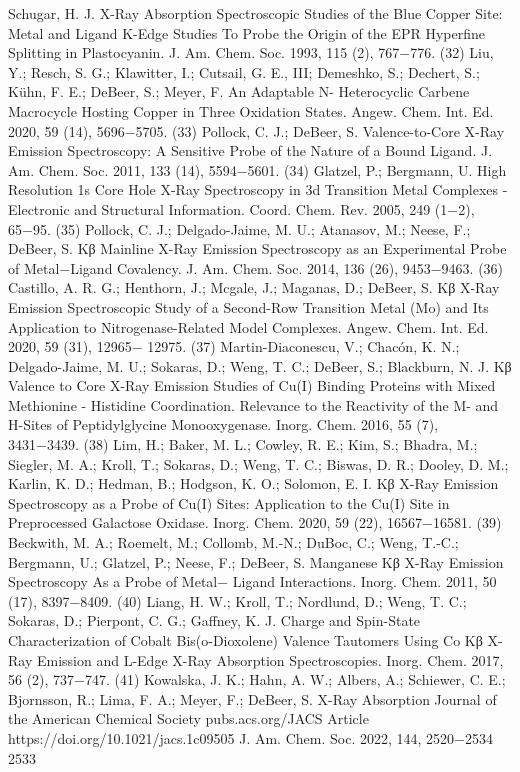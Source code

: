 \documentclass{article}
\begin{document}
Schugar, H. J. X-Ray Absorption Spectroscopic Studies of the Blue
Copper Site: Metal and Ligand K-Edge Studies To Probe the Origin
of the EPR Hyperfine Splitting in Plastocyanin. J. Am. Chem. Soc.
1993, 115 (2), 767−776.
(32) Liu, Y.; Resch, S. G.; Klawitter, I.; Cutsail, G. E., III; Demeshko,
S.; Dechert, S.; Kühn, F. E.; DeBeer, S.; Meyer, F. An Adaptable N-
Heterocyclic Carbene Macrocycle Hosting Copper in Three
Oxidation States. Angew. Chem. Int. Ed. 2020, 59 (14), 5696−5705.
(33) Pollock, C. J.; DeBeer, S. Valence-to-Core X-Ray Emission
Spectroscopy: A Sensitive Probe of the Nature of a Bound Ligand. J.
Am. Chem. Soc. 2011, 133 (14), 5594−5601.
(34) Glatzel, P.; Bergmann, U. High Resolution 1s Core Hole X-Ray
Spectroscopy in 3d Transition Metal Complexes - Electronic and
Structural Information. Coord. Chem. Rev. 2005, 249 (1−2), 65−95.
(35) Pollock, C. J.; Delgado-Jaime, M. U.; Atanasov, M.; Neese, F.;
DeBeer, S. Kβ Mainline X-Ray Emission Spectroscopy as an
Experimental Probe of Metal−Ligand Covalency. J. Am. Chem. Soc.
2014, 136 (26), 9453−9463.
(36) Castillo, A. R. G.; Henthorn, J.; Mcgale, J.; Maganas, D.;
DeBeer, S. Kβ X-Ray Emission Spectroscopic Study of a Second-Row
Transition Metal (Mo) and Its Application to Nitrogenase-Related
Model Complexes. Angew. Chem. Int. Ed. 2020, 59 (31), 12965−
12975.
(37) Martin-Diaconescu, V.; Chacón, K. N.; Delgado-Jaime, M. U.;
Sokaras, D.; Weng, T. C.; DeBeer, S.; Blackburn, N. J. Kβ Valence to
Core X-Ray Emission Studies of Cu(I) Binding Proteins with Mixed
Methionine - Histidine Coordination. Relevance to the Reactivity of
the M- and H-Sites of Peptidylglycine Monooxygenase. Inorg. Chem.
2016, 55 (7), 3431−3439.
(38) Lim, H.; Baker, M. L.; Cowley, R. E.; Kim, S.; Bhadra, M.;
Siegler, M. A.; Kroll, T.; Sokaras, D.; Weng, T. C.; Biswas, D. R.;
Dooley, D. M.; Karlin, K. D.; Hedman, B.; Hodgson, K. O.; Solomon,
E. I. Kβ X-Ray Emission Spectroscopy as a Probe of Cu(I) Sites:
Application to the Cu(I) Site in Preprocessed Galactose Oxidase.
Inorg. Chem. 2020, 59 (22), 16567−16581.
(39) Beckwith, M. A.; Roemelt, M.; Collomb, M.-N.; DuBoc, C.;
Weng, T.-C.; Bergmann, U.; Glatzel, P.; Neese, F.; DeBeer, S.
Manganese Kβ X-Ray Emission Spectroscopy As a Probe of Metal−
Ligand Interactions. Inorg. Chem. 2011, 50 (17), 8397−8409.
(40) Liang, H. W.; Kroll, T.; Nordlund, D.; Weng, T. C.; Sokaras,
D.; Pierpont, C. G.; Gaffney, K. J. Charge and Spin-State
Characterization of Cobalt Bis(o-Dioxolene) Valence Tautomers
Using Co Kβ X-Ray Emission and L-Edge X-Ray Absorption
Spectroscopies. Inorg. Chem. 2017, 56 (2), 737−747.
(41) Kowalska, J. K.; Hahn, A. W.; Albers, A.; Schiewer, C. E.;
Bjornsson, R.; Lima, F. A.; Meyer, F.; DeBeer, S. X-Ray Absorption
Journal of the American Chemical Society
pubs.acs.org/JACS
Article
https://doi.org/10.1021/jacs.1c09505
J. Am. Chem. Soc. 2022, 144, 2520−2534
2533
\end{document}
